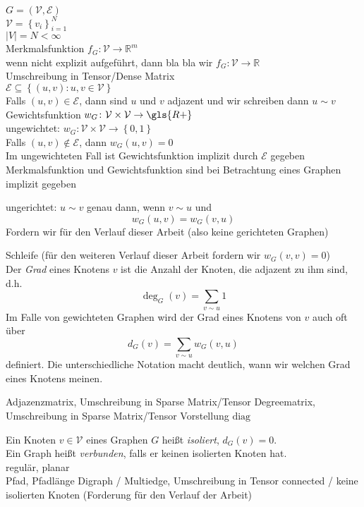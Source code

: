 $G = \left(\mathcal{V}, \mathcal{E}\right)$\\
$\mathcal{V} = {\left\{ v_i \right\}}^N_{i=1}$\\
$\left| V \right| = N < \infty$\\
Merkmalsfunktion $f_G \colon \mathcal{V} \to \mathbb{R}^m$\\
wenn nicht explizit aufgeführt, dann bla bla wir $f_G \colon \mathcal{V} \to \mathbb{R}$\\
Umschreibung in Tensor/Dense Matrix\\
$\mathcal{E} \subseteq \left\{ \left(u, v\right) \colon u, v \in \mathcal{V} \right\}$\\
Falls $\left( u, v \right) \in \mathcal{E}$, dann sind $u$ und $v$ adjazent und wir schreiben dann $u \sim v$\\
Gewichtsfunktion $w_G \colon \mathcal{V} \times \mathcal{V} \to \gls{R+}$\\
ungewichtet: $w_G \colon \mathcal{V} \times \mathcal{V} \to \left\{ 0, 1 \right\}$\\
Falls $\left( u, v \right) \notin \mathcal{E}$, dann $w_G\left(u, v\right) = 0$\\
Im ungewichteten Fall ist Gewichtsfunktion implizit durch $\mathcal{E}$ gegeben\\
Merkmalsfunktion und Gewichtsfunktion sind bei Betrachtung eines Graphen implizit gegeben 

ungerichtet:
$u \sim v$ genau dann, wenn $v \sim u$ und
\begin{equation}
  w_G\left(u, v\right) = w_G\left(v, u\right)
\end{equation}
Fordern wir für den Verlauf dieser Arbeit (also keine gerichteten Graphen)

Schleife (für den weiteren Verlauf dieser Arbeit fordern wir $w_G\left(v, v\right) = 0$)\\

Der \emph{Grad} eines Knotens $v$ ist die Anzahl der Knoten, die adjazent zu ihm sind, d.h.
\begin{equation}
  \deg_G\left(v\right) = \sum_{v \sim u} 1
\end{equation}
Im Falle von gewichteten Graphen wird der Grad eines Knotens von $v$ auch oft über
\begin{equation}
  d_G\left(v\right) = \sum_{v \sim u} w_G\left(v, u\right)
\end{equation}
definiert.
Die unterschiedliche Notation macht deutlich, wann wir welchen Grad eines Knotens meinen.

Adjazenzmatrix, Umschreibung in Sparse Matrix/Tensor
Degreematrix, Umschreibung in Sparse Matrix/Tensor
Vorstellung $\text{diag}$

Ein Knoten $v \in \mathcal{V}$ eines Graphen $G$ heißt \emph{isoliert}, $d_G\left(v\right) = 0$.\\
Ein Graph heißt \emph{verbunden}, falls er keinen isolierten Knoten hat.\\

regulär, planar\\

Pfad, Pfadlänge
Digraph / Multiedge, Umschreibung in Tensor
connected / keine isolierten Knoten (Forderung für den Verlauf der Arbeit)
